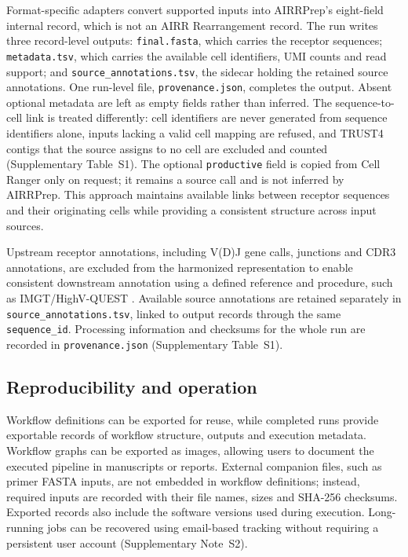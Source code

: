 \documentclass[unnumsec,webpdf,contemporary,large]{oup-authoring-template}
\begin{document}
Format-specific adapters convert supported inputs into AIRRPrep's eight-field internal record, which is not an AIRR Rearrangement record. The run writes three record-level outputs: \texttt{final.fasta}, which carries the receptor sequences; \texttt{metadata.tsv}, which carries the available cell identifiers, UMI counts and read support; and \texttt{source\_annotations.tsv}, the sidecar holding the retained source annotations. One run-level file, \texttt{provenance.json}, completes the output. Absent optional metadata are left as empty fields rather than inferred. The sequence-to-cell link is treated differently: cell identifiers are never generated from sequence identifiers alone, inputs lacking a valid cell mapping are refused, and TRUST4 contigs that the source assigns to no cell are excluded and counted (Supplementary Table~S1). The optional \texttt{productive} field is copied from Cell Ranger only on request; it remains a source call and is not inferred by AIRRPrep. This approach maintains available links between receptor sequences and their originating cells while providing a consistent structure across input sources.

Upstream receptor annotations, including V(D)J gene calls, junctions and CDR3 annotations, are excluded from the harmonized representation to enable consistent downstream annotation using a defined reference and procedure, such as IMGT/HighV-QUEST \citep{alamyar2012}. Available source annotations are retained separately in \texttt{source\_annotations.tsv}, linked to output records through the same \texttt{sequence\_id}. Processing information and checksums for the whole run are recorded in \texttt{provenance.json} (Supplementary Table~S1).

\subsection{Reproducibility and operation}
Workflow definitions can be exported for reuse, while completed runs provide exportable records of workflow structure, outputs and execution metadata. Workflow graphs can be exported as images, allowing users to document the executed pipeline in manuscripts or reports. External companion files, such as primer FASTA inputs, are not embedded in workflow definitions; instead, required inputs are recorded with their file names, sizes and SHA-256 checksums. Exported records also include the software versions used during execution. Long-running jobs can be recovered using email-based tracking without requiring a persistent user account (Supplementary Note~S2).
\end{document}

